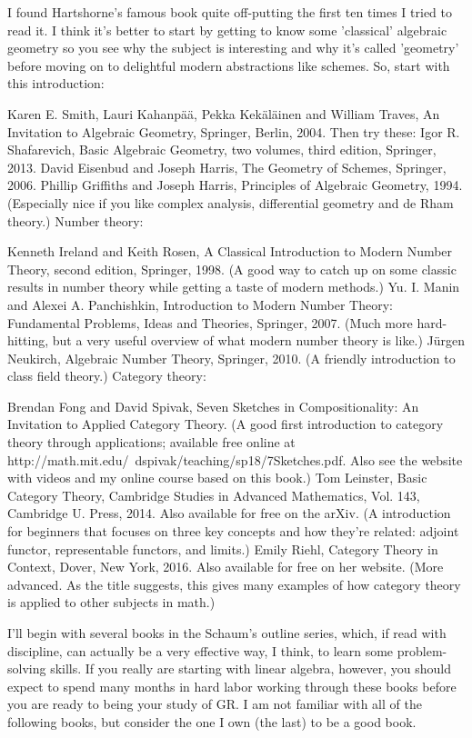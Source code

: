 \documentclass[10pt,a4paper]{book}
\theoremstyle{definition}
\begin{document}
I found Hartshorne's famous book quite off-putting the first ten times I tried to read it. I think it's better to start by getting to know some 'classical' algebraic geometry so you see why the subject is interesting and why it's called 'geometry' before moving on to delightful modern abstractions like schemes. So, start with this introduction:

Karen E. Smith, Lauri Kahanpää, Pekka Kekäläinen and William Traves, An Invitation to Algebraic Geometry, Springer, Berlin, 2004.
Then try these:
Igor R. Shafarevich, Basic Algebraic Geometry, two volumes, third edition, Springer, 2013.
David Eisenbud and Joseph Harris, The Geometry of Schemes, Springer, 2006.
Phillip Griffiths and Joseph Harris, Principles of Algebraic Geometry, 1994. (Especially nice if you like complex analysis, differential geometry and de Rham theory.)
Number theory:

Kenneth Ireland and Keith Rosen, A Classical Introduction to Modern Number Theory, second edition, Springer, 1998. (A good way to catch up on some classic results in number theory while getting a taste of modern methods.)
Yu. I. Manin and Alexei A. Panchishkin, Introduction to Modern Number Theory: Fundamental Problems, Ideas and Theories, Springer, 2007. (Much more hard-hitting, but a very useful overview of what modern number theory is like.)
Jürgen Neukirch, Algebraic Number Theory, Springer, 2010. (A friendly introduction to class field theory.)
Category theory:

Brendan Fong and David Spivak, Seven Sketches in Compositionality: An Invitation to Applied Category Theory. (A good first introduction to category theory through applications; available free online at http://math.mit.edu/~dspivak/teaching/sp18/7Sketches.pdf. Also see the website with videos and my online course based on this book.)
Tom Leinster, Basic Category Theory, Cambridge Studies in Advanced Mathematics, Vol. 143, Cambridge U. Press, 2014. Also available for free on the arXiv. (A introduction for beginners that focuses on three key concepts and how they're related: adjoint functor, representable functors, and limits.)
Emily Riehl, Category Theory in Context, Dover, New York, 2016. Also available for free on her website. (More advanced. As the title suggests, this gives many examples of how category theory is applied to other subjects in math.)

I'll begin with several books in the Schaum's outline series, which, if read with discipline, can actually be a very effective way, I think, to learn some problem-solving skills.  If you really are starting with linear algebra, however, you should expect to spend many months in hard labor working through these books before you are ready to being your study of GR.  I am not familiar with all of the following books, but consider the one I own (the last) to be a good book.
\end{document}
